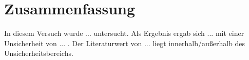 
\section{Zusammenfassung}
\label{cap:Zusammenfassung}

In diesem Versuch wurde ... untersucht. Als Ergebnis ergab sich ... mit einer Unsicherheit von ... . Der Literaturwert von ... liegt innerhalb/außerhalb des Unsicherheitsbereichs.
